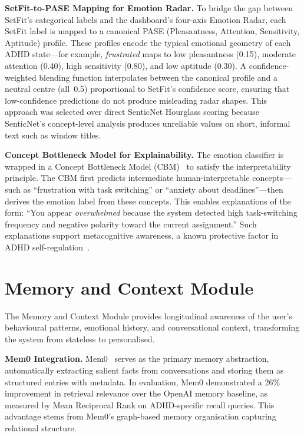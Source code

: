 \textbf{SetFit-to-PASE Mapping for Emotion Radar.} To bridge the gap between SetFit's categorical labels and the dashboard's four-axis Emotion Radar, each SetFit label is mapped to a canonical PASE (Pleasantness, Attention, Sensitivity, Aptitude) profile. These profiles encode the typical emotional geometry of each ADHD state---for example, \emph{frustrated} maps to low pleasantness (0.15), moderate attention (0.40), high sensitivity (0.80), and low aptitude (0.30). A confidence-weighted blending function interpolates between the canonical profile and a neutral centre (all~0.5) proportional to SetFit's confidence score, ensuring that low-confidence predictions do not produce misleading radar shapes. This approach was selected over direct SenticNet Hourglass scoring because SenticNet's concept-level analysis produces unreliable values on short, informal text such as window titles.

\textbf{Concept Bottleneck Model for Explainability.} The emotion classifier is wrapped in a Concept Bottleneck Model (CBM)~\cite{koh2020} to satisfy the interpretability principle. The CBM first predicts intermediate human-interpretable concepts---such as ``frustration with task switching'' or ``anxiety about deadlines''---then derives the emotion label from these concepts. This enables explanations of the form: ``You appear \emph{overwhelmed} because the system detected high task-switching frequency and negative polarity toward the current assignment.'' Such explanations support metacognitive awareness, a known protective factor in ADHD self-regulation~\cite{diamond2013}.


\section{Memory and Context Module}
\label{sec:memory_module}

The Memory and Context Module provides longitudinal awareness of the user's behavioural patterns, emotional history, and conversational context, transforming the system from stateless to personalised.

\textbf{Mem0 Integration.} Mem0~\cite{chhikara2025} serves as the primary memory abstraction, automatically extracting salient facts from conversations and storing them as structured entries with metadata. In evaluation, Mem0 demonstrated a 26\% improvement in retrieval relevance over the OpenAI memory baseline, as measured by Mean Reciprocal Rank on ADHD-specific recall queries. This advantage stems from Mem0's graph-based memory organisation capturing relational structure.

